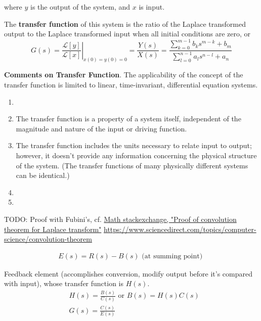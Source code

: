 \documentclass[10pt]{amsart}
\begin{document}
\begin{multicols*}{2}
where $y$ is the output of the system, and $x$ is input.

The \textbf{transfer function} of this system is the ratio of the Laplace transformed output to the Laplace transformed input when all initial conditions are zero, or
\begin{equation}
	G(s) = \left. \frac{\mathcal{L}[y] }{ \mathcal{L}[x] } \right|_{x(0) = y(0) = 0} = \frac{Y(s)}{X(s)} = \frac{ \sum_{k=0}^{m-1} b_ks^{m-k} + b_m }{ \sum_{l=0}^{n-1} a_l s^{n-l } + a_n }
\end{equation}

\textbf{Comments on Transfer Function}. The applicability of the concept of the transfer function is limited to linear, time-invariant, differential equation systems.
\begin{enumerate}
	\item 
	\item The transfer function is a property of a system itself, independent of the magnitude and nature of the input or driving function.
	\item The transfer function includes the units necessary to relate input to output; however, it doesn't provide any information concerning the physical structure of the system. (The transfer functions of many physically different systems can be identical.)
	\item
	\item 
\end{enumerate}


TODO: Proof with Fubini's, cf. \href{https://math.stackexchange.com/questions/3422840/proof-of-convolution-theorem-for-laplace-transform}{Math stackexchange, "Proof of convolution theorem for Laplace transform"} \url{https://www.sciencedirect.com/topics/computer-science/convolution-theorem}

\[
\begin{gathered}
E(s)= R(s) - B(s) \text{ (at summing point) }
\end{gathered}
\]

Feedback element (accomplishes conversion, modify output before it's compared with input), whose transfer function is $H(s)$.
\begin{equation}
\begin{aligned}
& H(s) = \frac{B(s)}{ C(s)} \text{ or }  B(s) = H(s) C(s) \\ 
& G(s) = \frac{C(s)}{E(s)}
\end{aligned}
\end{equation}


\end{multicols*}
\end{document}
